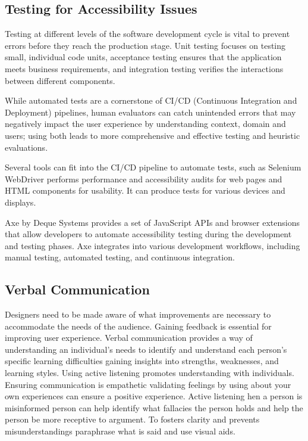 \documentclass{article}
\begin{document}
\subsection{Testing for Accessibility Issues}

Testing at different levels of the software development cycle is vital to prevent errors before they reach the production stage. Unit testing focuses on testing small, individual code units, acceptance testing ensures that the application meets business requirements, and integration testing verifies the interactions between different components. 

While automated tests are a cornerstone of CI/CD (Continuous Integration and Deployment) pipelines, human evaluators can catch unintended errors that may negatively impact the user experience by understanding context, domain and users; using both leads to more comprehensive and effective testing and heuristic evaluations.

Several tools can fit into the CI/CD pipeline to automate tests, such as Selenium WebDriver performs performance and accessibility audits for web pages and HTML components for usability. It can produce tests for various devices and displays.

Axe by Deque Systems provides a set of JavaScript APIs and browser extensions that allow developers to automate accessibility testing during the development and testing phases. Axe integrates into various development workflows, including manual testing, automated testing, and continuous integration. 


\subsection{Verbal Communication }


 Designers need to be made aware of what improvements are necessary to accommodate the needs of the audience. Gaining feedback is essential for improving user experience. Verbal communication provides a way of understanding an individual's needs to identify and understand each person's specific learning difficulties gaining insights into strengths, weaknesses, and learning styles. Using active listening promotes understanding with individuals. Ensuring communication is empathetic validating feelings by using about your own experiences can ensure a positive experience. Active listening hen a person is misinformed person can help identify what fallacies the person holds and help the person be more receptive to argument. To fosters clarity and prevents misunderstandings paraphrase what is said and use visual aids.
\end{document}
